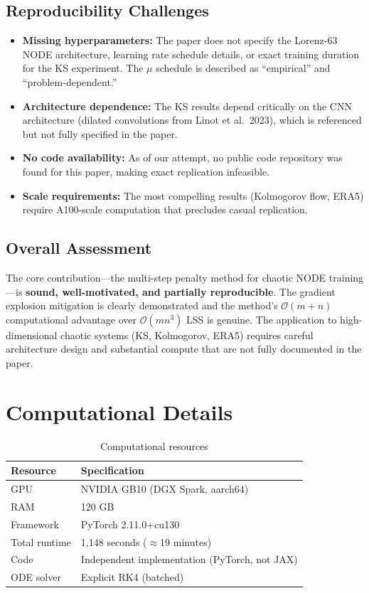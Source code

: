 \documentclass[11pt]{article}
\begin{document}
\subsection{Reproducibility Challenges}
\begin{itemize}[leftmargin=*]
    \item \textbf{Missing hyperparameters:} The paper does not specify the Lorenz-63 NODE architecture, learning rate schedule details, or exact training duration for the KS experiment. The $\mu$ schedule is described as ``empirical'' and ``problem-dependent.''
    \item \textbf{Architecture dependence:} The KS results depend critically on the CNN architecture (dilated convolutions from Linot et al.\ 2023), which is referenced but not fully specified in the paper.
    \item \textbf{No code availability:} As of our attempt, no public code repository was found for this paper, making exact replication infeasible.
    \item \textbf{Scale requirements:} The most compelling results (Kolmogorov flow, ERA5) require A100-scale computation that precludes casual replication.
\end{itemize}

\subsection{Overall Assessment}

The core contribution---the multi-step penalty method for chaotic NODE training---is \textbf{sound, well-motivated, and partially reproducible}. The gradient explosion mitigation is clearly demonstrated and the method's $\mathcal{O}(m+n)$ computational advantage over $\mathcal{O}(mn^3)$ LSS is genuine. The application to high-dimensional chaotic systems (KS, Kolmogorov, ERA5) requires careful architecture design and substantial compute that are not fully documented in the paper.

\section{Computational Details}

\begin{table}[H]
\centering
\caption{Computational resources}
\label{tab:compute}
\begin{tabular}{@{}ll@{}}
\toprule
\textbf{Resource} & \textbf{Specification} \\
\midrule
GPU & NVIDIA GB10 (DGX Spark, aarch64) \\
RAM & 120 GB \\
Framework & PyTorch 2.11.0+cu130 \\
Total runtime & 1,148 seconds ($\approx$19 minutes) \\
Code & Independent implementation (PyTorch, not JAX) \\
ODE solver & Explicit RK4 (batched) \\
\bottomrule
\end{tabular}
\end{table}
\end{document}
